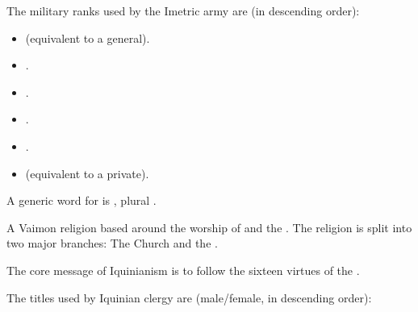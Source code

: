 \begin{gloss}
\begin{subgloss}
  
  
  \begin{comment}
  \subparagraph{Military ranks}
  \end{comment}
  The military ranks used by the Imetric army are (in descending order): 
  
  \begin{itemize}
    \item \Deccor{} (equivalent to a general). 
    \item \Retaxis{}. 
    \item \Salican{}. 
    \item \Vexstra{}. 
    \item \Corphin{}. 
    \item \Inclan{} (equivalent to a private). 
  \end{itemize}

  A generic word for  is \Rengos, plural \Rengoi. 
\end{subgloss}






\begin{comment}
\paragraph{\Iquinian Church}
\end{comment}
A Vaimon religion based around the worship of \Iquin{} and the \sephiroth. 
The religion is split into two major branches: 
The  Church and the . 

The core message of Iquinianism is to follow the sixteen virtues of the \sephiroth.






\begin{subgloss}
  \begin{comment}
  \subparagraph{Clerical ranks}
  \end{comment}
  The titles used by Iquinian clergy are (male/female, in descending order): 
  

\end{subgloss}
\end{gloss}
